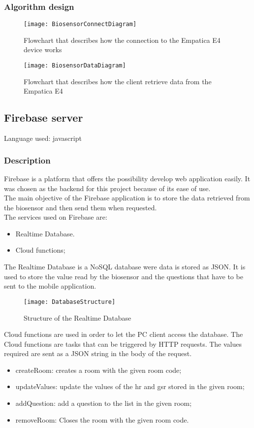 \subsubsection{Algorithm design}
\begin{figure}[H]
	\centering
	\texttt{[image: BiosensorConnectDiagram]}
	\caption{Flowchart that describes how the connection to the Empatica E4 device works}
\end{figure}

\begin{figure}[H]
	\centering
	\texttt{[image: BiosensorDataDiagram]}
	\caption{Flowchart that describes how the client retrieve data from the Empatica E4}
\end{figure}
\pagebreak

\subsection{Firebase server}
Language used: javascript

\subsubsection{Description}
Firebase is a platform that offers the possibility develop web application easily. It was chosen as the backend for this project because of its ease of use.\\
The main objective of the Firebase application is to store the data retrieved from the biosensor and then send them when requested.\\
The services used on Firebase are:
\begin{itemize}
	\item Realtime Database.
	\item Cloud functions;
\end{itemize}
The Realtime Database is a NoSQL database were data is stored as JSON. It is used to store the value read by the biosensor and the questions that have to be sent to the mobile application.
\begin{figure}[H]
	\centering
	\texttt{[image: DatabaseStructure]}
	\caption{Structure of the Realtime Database}
\end{figure}
Cloud functions are used in order to let the PC client access the database. The Cloud functions are tasks that can be triggered by HTTP requests. The values required are sent as a JSON string in the body of the request.
\begin{itemize}
	\item createRoom: creates a room with the given room code;
	\item updateValues: update the values of the hr and gsr stored in the given room;
	\item addQuestion: add a question to the list in the given room;
	\item removeRoom: Closes the room with the given room code.
\end{itemize}